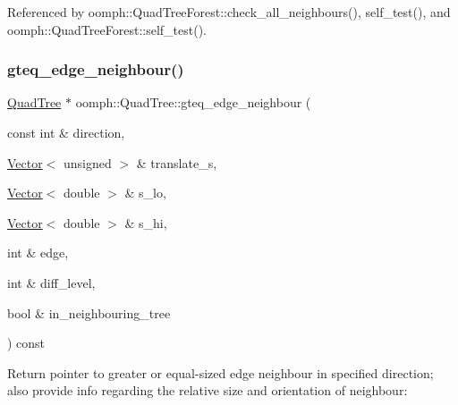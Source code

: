 Referenced by oomph\+::\+Quad\+Tree\+Forest\+::check\+\_\+all\+\_\+neighbours(), self\+\_\+test(), and oomph\+::\+Quad\+Tree\+Forest\+::self\+\_\+test().

\mbox{\label{classoomph_1_1QuadTree_ab8cf08ddd68ec671c111bc55f9b37e70}} 
\subsubsection{\texorpdfstring{gteq\+\_\+edge\+\_\+neighbour()}{gteq\_edge\_neighbour()}\hspace{0.1cm}{\footnotesize\ttfamily [1/2]}}
{\footnotesize\ttfamily \hyperlink{classoomph_1_1QuadTree}{Quad\+Tree} $\ast$ oomph\+::\+Quad\+Tree\+::gteq\+\_\+edge\+\_\+neighbour (\begin{DoxyParamCaption}\item[{const int \&}]{direction,  }\item[{\hyperlink{classoomph_1_1Vector}{Vector}$<$ unsigned $>$ \&}]{translate\+\_\+s,  }\item[{\hyperlink{classoomph_1_1Vector}{Vector}$<$ double $>$ \&}]{s\+\_\+lo,  }\item[{\hyperlink{classoomph_1_1Vector}{Vector}$<$ double $>$ \&}]{s\+\_\+hi,  }\item[{int \&}]{edge,  }\item[{int \&}]{diff\+\_\+level,  }\item[{bool \&}]{in\+\_\+neighbouring\+\_\+tree }\end{DoxyParamCaption}) const}



Return pointer to greater or equal-\/sized edge neighbour in specified {\ttfamily direction}; also provide info regarding the relative size and orientation of neighbour\+: 


